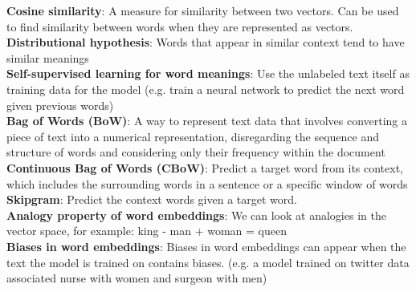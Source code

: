 \documentclass[a4paper,7pt,landscape]{extarticle}
\begin{document}
\begin{multicols}{3}
\begin{boxA}
\textbf{Cosine similarity}: A measure for similarity between two vectors. Can be used to find similarity between words when they are represented as vectors.\\
\textbf{Distributional hypothesis}: Words that appear in similar context tend to have similar meanings\\
\textbf{Self-supervised learning for word meanings}: Use the unlabeled text itself as training data for the model (e.g. train a neural network to predict the next word given previous words)\\
\textbf{Bag of Words (BoW)}: A way to represent text data that involves converting a piece of text into a numerical representation, disregarding the sequence and structure of words and considering only their frequency within the document\\
\textbf{Continuous Bag of Words (CBoW)}: Predict a target word from its context, which includes the surrounding words in a sentence or a specific window of words\\
\textbf{Skipgram}: Predict the context words given a target word.\\
\textbf{Analogy property of word embeddings}: We can look at analogies in the vector space, for example: king - man + woman = queen\\
\textbf{Biases in word embeddings}: Biases in word embeddings can appear when the text the model is trained on contains biases. (e.g. a model trained on twitter data associated nurse with women and surgeon with men)
\end{boxA}


\end{multicols}
\end{document}
